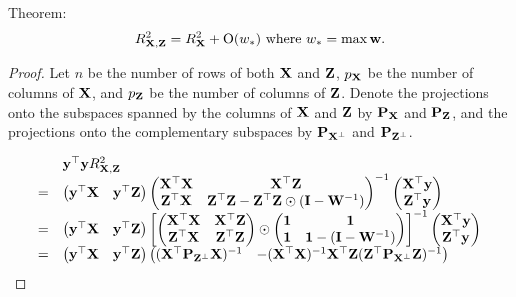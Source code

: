 \documentclass{amsart}[12pt]
\newtheorem{theorem}{Theorem}[section]
\begin{document}
Theorem:
\[
R^2_{{\bf X}, {\bf Z}} = R^2_{{\bf X}} + \text{O}(w_*) \text{ where } w_* = \max{{\bf w}}.
\]

\begin{proof}
Let $n$ be the number of rows of both ${\bf X}$ and ${\bf Z}$, $p_{\bf X}$ be the number of columns of ${\bf X}$, and $p_{\bf Z}$
be the number of columns of ${\bf Z}$. Denote the projections onto the subspaces spanned by the columns of ${\bf X}$
and ${\bf Z}$ by ${\bf P}_{\bf X}$ and ${\bf P}_{\bf Z}$, and the projections onto the complementary subspaces by
${\bf P}_{{\bf X}^\perp}$ and ${\bf P}_{{\bf Z}^\perp}$.

\small
\begin{equation*}
\begin{array}{ll}
&{\bf y}^\top {\bf y} R^2_{{\bf X}, {\bf Z}} \\
=&
\begin{pmatrix}
{\bf y}^\top {\bf X} & {\bf y}^\top {\bf Z}
\end{pmatrix}
\begin{pmatrix}
{\bf X}^\top {\bf X} & {\bf X}^\top {\bf Z} \\
{\bf Z}^\top {\bf X} & {\bf Z}^\top {\bf Z} - {\bf Z}^\top {\bf Z} \odot ({\bf I} - {\bf W}^{-1})
\end{pmatrix}^{-1}
\begin{pmatrix}
{\bf X}^\top {\bf y}\\
{\bf Z}^\top {\bf y}
\end{pmatrix} \\
=&
\begin{pmatrix}
{\bf y}^\top {\bf X} & {\bf y}^\top {\bf Z}
\end{pmatrix}
\begin{bmatrix}
\begin{pmatrix}
{\bf X}^\top {\bf X} & {\bf X}^\top {\bf Z} \\
{\bf Z}^\top {\bf X} & {\bf Z}^\top {\bf Z}
\end{pmatrix}
\odot
\begin{pmatrix}
{\bf1} & {\bf 1} \\
{\bf 1} & {\bf 1} - ({\bf I} - {\bf W}^{-1})
\end{pmatrix}
\end{bmatrix}
^{-1}
\begin{pmatrix}
{\bf X}^\top {\bf y}\\
{\bf Z}^\top {\bf y}
\end{pmatrix} \\
=&
\begin{pmatrix}
{\bf y}^\top {\bf X} & {\bf y}^\top {\bf Z}
\end{pmatrix}
\begin{pmatrix}
({\bf X}^\top {\bf P}_{{\bf Z}^\perp} {\bf X})^{-1} & -({\bf X}^\top {\bf X})^{-1} {\bf X}^\top {\bf Z} ({\bf Z}^\top {\bf P}_{{\bf X}^\perp} {\bf Z})^{-1} \\

\end{pmatrix}
\end{array}
\end{equation*}
\end{proof}
\end{document}
